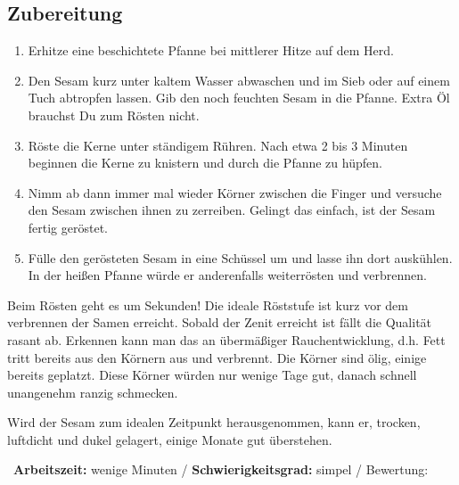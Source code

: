 \begin{minipage}[t]{0.58\textwidth}
\vspace{0pt}
\subsection*{Zubereitung}
\begin{enumerate}[leftmargin=*, itemindent=14pt]

\item Erhitze eine beschichtete Pfanne bei mittlerer Hitze auf dem Herd.

\item Den Sesam kurz unter kaltem Wasser abwaschen und im Sieb oder auf einem Tuch abtropfen lassen. Gib den noch feuchten Sesam in die Pfanne. Extra Öl brauchst Du zum Rösten nicht.

\item Röste die Kerne unter ständigem Rühren. Nach etwa 2 bis 3 Minuten beginnen die Kerne zu knistern und durch die Pfanne zu hüpfen.

\item Nimm ab dann immer mal wieder Körner zwischen die Finger und versuche den Sesam zwischen ihnen zu zerreiben. Gelingt das einfach, ist der Sesam fertig geröstet.

\item Fülle den gerösteten Sesam in eine Schüssel um und lasse ihn dort auskühlen. In der heißen Pfanne würde er anderenfalls weiterrösten und verbrennen.

\end{enumerate}

Beim Rösten geht es um Sekunden! Die ideale Röststufe ist kurz vor dem verbrennen der Samen erreicht. Sobald der Zenit erreicht ist fällt die Qualität rasant ab. Erkennen kann man das an übermäßiger Rauchentwicklung, d.h. Fett tritt bereits aus den Körnern aus und verbrennt. Die Körner sind ölig, einige bereits geplatzt. Diese Körner würden nur wenige Tage gut, danach schnell unangenehm ranzig schmecken.

Wird der Sesam zum idealen Zeitpunkt herausgenommen, kann er, trocken, luftdicht und dukel gelagert, einige Monate gut überstehen.

\end{minipage}
\vfill
\decothreeright \, \textbf{Arbeitszeit:} wenige Minuten	 / \textbf{Schwierigkeitsgrad:} simpel	 / \decothreeleft \hfill Bewertung: \Circle  \Circle \Circle  \Circle \Circle